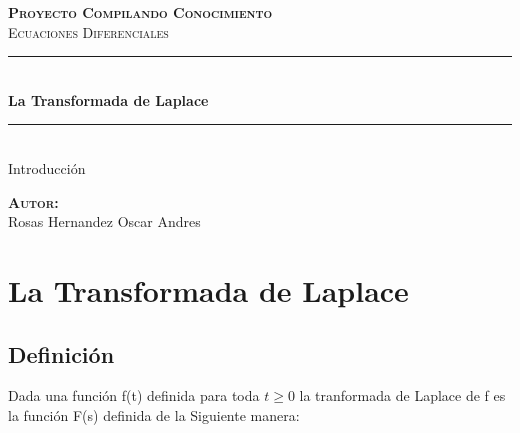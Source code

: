 \documentclass[12pt]{report}                                %
\author{Oscar Andrés Rosas}                                 %
\begin{document}
\begin{titlepage}

	\center
	\textbf{\textsc{\Large Proyecto Compilando Conocimiento}}\\[1.0cm] 
	\textsc{\Large Ecuaciones Diferenciales}\\[1.0cm] 

	\rule{\linewidth}{0.5mm} \\[1.0cm]
		{ \huge \bfseries La Transformada de Laplace}\\[1.0cm] 
	\rule{\linewidth}{0.5mm} \\[2.0cm]
	
	{\LARGE Introducción}\\[7cm] 
	
	\begin{center} \large
	\textbf{\textsc{Autor:}}\\
	Rosas Hernandez Oscar Andres
	\end{center}

	\vfill

\end{titlepage}

\tableofcontents{}
\clearpage

\chapter{La Transformada de Laplace}
    \clearpage

    \section{Definición}
        Dada una función f(t) definida para toda $t \geq 0$ la tranformada de
        Laplace de f es la función F(s) definida de la Siguiente manera:
\end{document}

